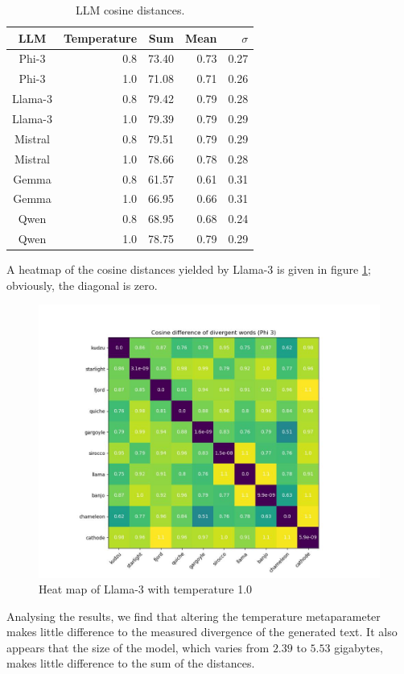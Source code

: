 \documentclass[9pt,a4paper,twoside]{rho-class/rho}
\begin{document}
\begin{table}
\caption{LLM cosine distances.}
\label{divergence_res1}
\begin{tabular}{crrrr}
\toprule
\textbf{LLM} & \textbf{Temperature} & \textbf{Sum} & \textbf{Mean} & \textbf{$\sigma$} \\ \hline 
Phi-3 & 0.8 & 73.40 & 0.73 & 0.27 \\
Phi-3 & 1.0 & 71.08 & 0.71 & 0.26 \\
Llama-3 & 0.8 & 79.42 & 0.79 & 0.28 \\
Llama-3 & 1.0 & 79.39 & 0.79 & 0.29 \\
Mistral & 0.8 & 79.51 & 0.79 & 0.29 \\
Mistral & 1.0 & 78.66 & 0.78 & 0.28 \\
Gemma & 0.8 & 61.57 & 0.61 & 0.31 \\
Gemma & 1.0 & 66.95 & 0.66 & 0.31 \\
Qwen & 0.8 & 68.95 & 0.68 & 0.24 \\
Qwen & 1.0 & 78.75 & 0.79 & 0.29 \\ \hline
\end{tabular}
\end{table}
A heatmap of the cosine distances yielded by Llama-3 is given in figure \ref{fig:llama3_heatmap}; obviously, the diagonal is zero. 

\begin{figure}
    \centering
    \includegraphics[width=1.3\linewidth]{cos_dist_llama3_3.jpg}
    \caption{Heat map of Llama-3 with temperature 1.0}
    \label{fig:llama3_heatmap}
\end{figure}
Analysing the results, we find that altering the temperature metaparameter makes little difference to the measured divergence of the generated text. It also appears that the size of the model, which varies from $2.39$ to $5.53$ gigabytes, makes little difference to the sum of the distances. 
\end{document}
